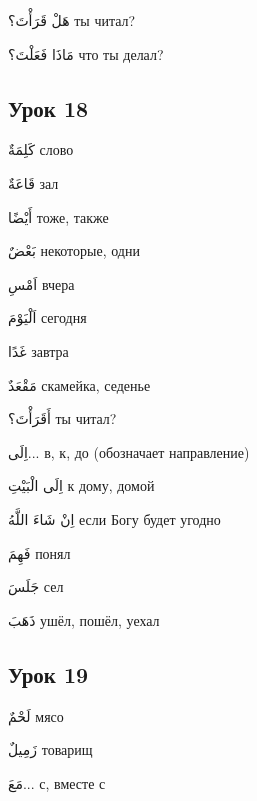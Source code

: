 \documentclass[a5paper]{article}
\newcommand\textstyleDropCaps[1]{#1}
\newcommand\textstyleCaptioncharacters[1]{#1}
\begin{document}
\textstyleCaptioncharacters{هَلْ قَرَأْتَ؟ }\textstyleDropCaps{ты читал?‎}

\textstyleCaptioncharacters{مَاذَا فَعَلْتَ؟ }\textstyleDropCaps{что ты де­лал?‎}

\subsection[Урок 18‎]{\textstyleDropCaps{Урок 18‎}}
\textstyleCaptioncharacters{كَلِمَةٌ }\textstyleDropCaps{слово‎}

\textstyleCaptioncharacters{قَاعَةٌ }\textstyleDropCaps{зал‎}

\textstyleCaptioncharacters{أَيْضًا }\textstyleDropCaps{тоже, также‎}

\textstyleCaptioncharacters{بَعْضٌ }\textstyleDropCaps{некоторые, одни‎}

\textstyleCaptioncharacters{اَمْسِ }\textstyleDropCaps{вчера‎}

\textstyleCaptioncharacters{اَلْيَوْمَ }\textstyleDropCaps{сегодня‎}

\textstyleCaptioncharacters{غَدًا }\textstyleDropCaps{завтра‎}

\textstyleCaptioncharacters{مَقْعَدٌ }\textstyleDropCaps{скамейка, седенье‎}

\textstyleCaptioncharacters{أَقَرَأْتَ؟ }\textstyleDropCaps{ты читал?‎}

\textstyleCaptioncharacters{اِلَى...ِ }\textstyleDropCaps{в, к, до (обозначает направление)‎}

\textstyleCaptioncharacters{اِلَى الْبَيْتِ }\textstyleDropCaps{к дому, домой‎}

\textstyleCaptioncharacters{اِنْ شَاءَ اللَّهُ }\textstyleDropCaps{если Богу будет угодно‎}

\textstyleCaptioncharacters{فَهِمَ }\textstyleDropCaps{понял‎}

\textstyleCaptioncharacters{جَلَسَ }\textstyleDropCaps{сел‎}

\textstyleCaptioncharacters{ذَهَبَ }\textstyleDropCaps{ушёл, пошёл, уехал‎}

\subsection[Урок 19‎]{\textstyleDropCaps{Урок 19‎}}
\textstyleCaptioncharacters{لَحْمٌ }\textstyleDropCaps{мясо‎}

\textstyleCaptioncharacters{زَمِيلٌ }\textstyleDropCaps{товарищ‎}

\textstyleCaptioncharacters{مَعَ...ِ }\textstyleDropCaps{с, вместе с‎}
\end{document}

